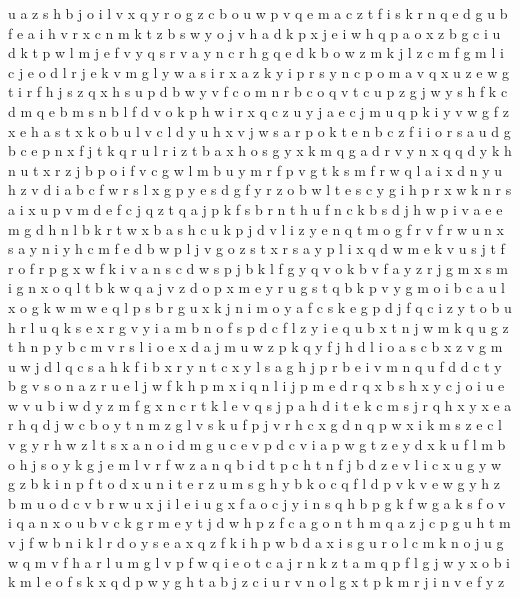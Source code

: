 \documentclass{article}
\begin{document}
u a z s h b j o i l v x q
y r o g z c
b o u w p v q e m a c z t f i s k r n
q e d g
u b
f e a i h v r x c n m k t z b s w y o j
v h a d k p x j
e i w h q p
a o x z b g c i u d k t p w l m j e f v y q s r
v a y n c r h
g q
e d k b o w z m
k j l z c m f g
m l i c j e o
d l r j
e k v m g
l y w a s i r
x a z k y i p r s
y n c p o m a v q x u z e w g t i r f h j s
z q x h s u p d b w y v f c o m n r
b c o q v
t
c
u p z g j w y s h f k c d m q e b
m s n b l f d v o k p h w i r x q c z u y j a
e
c j m u q p k i y v w g f z x e h a s
t x k o b u l v c
l d y u h x v j w s a r p o k t e n b c z f i
i o r s a u d g b c e p n x f j t k q
r u
l
r i z t b a x h o s g y
x k m q g a d r v y
n x q
q d y k h n u t x r z j b p o i f v c g w l m
b u y m r f
p v g t k s m f r w q l a i x d n y u h
z v d i a b c f w r s l x g p y e
s d g f y r z
o b w l t e s c y g i h p r x
w k n r s a i x u p v m d e f c j q z t
q a j p k f s b r n t h u
f n c k b s d j h w p i v a e
e m g d h n l b k r t
w x b a s h c u k p j d v l i z y e n q t m o g f r
v f r w u n x s a y
n i y h c m f e d b w p l j v g o z s t x r
s
a y p l i x q d w m e k v u s j t f r o
f r p g
x w f k i v a n s
c d w s p j b k l f g y q v
o k b v f a y z r j g m x s
m i g n x
o q
l t b k w q a j v z d o p x m e y r u g s
t
q b k p v
y g m o i b c a u l
x o g k w m
w e q l p s b r g u x k j n i m o y a f c
s k e g p d j f q c i z y t o b u h r l
u q k s e x r g v y i a m b n o f
s p d c f l z y i e q u b x t n j w m
k q u g z t h n p y b c m v r s l i o e x d a j
m u w z p k q y f j h d l i o a s c b x
z v g m u w j d l q c s a h k f i b x r y n
t c x y l s a g h j p r b e i v m n q u f d
d c t y b g v s o n a z r u e l j w f k h p m x i q
n l i j p m e d r q x b s h
x y c j o i u e w v
u b i w d y z m f g x n c r t k l e v q s j p a h
d i t e k c m s j r q h x y
x e a r h q d j w c b o y t n m z g l v s k u f p
j v r h c x g
d n q p w x i k m s z e c l v g y r h
w z l t s x a n o i d m g u c e v
p d
c v i a p w g t z e y d x k u f l m b o h j s
o y k g j e m l v r f w z a n q b i d t p c h
t n f j b d z e v l i c x u g y
w g z b k i n p f t o d x u
n i t e r z u m s g h y b k o c q f l d p v
k v e w g y h z b m u o d c
v
b r w u x j i
l e i u g x f a
o c j y i n s q h b p g k f w
g a
k s f o v
i q a n x o u b v c k g r m e y t j d w h p z f
c a g o n t
h m q a z j
c p g u h t m v j f w b n i k l r d o y s e a x q z
f k i h
p w b d a x i s g u r o l c m k
n o j u g w q m v f h a r l
u m g l v p f w q i e o t c a j r n k
z t a m q p f l g j w y x o b i k
m l e o f s k x q d p w y g h t a b j z c i u r v n
o l g x t p k m r j i n v e f y z
\end{document}
